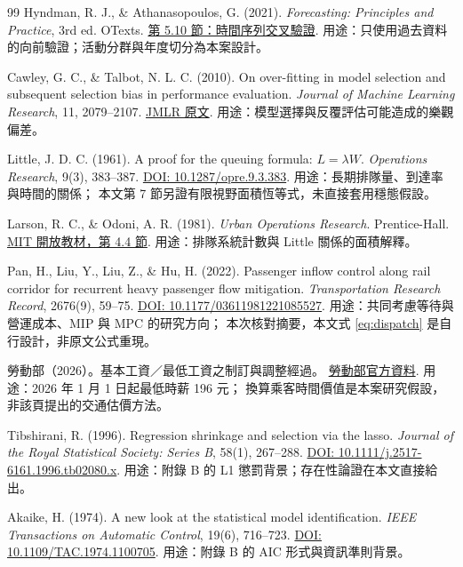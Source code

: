 \begin{thebibliography}{99}
Hyndman, R. J., \& Athanasopoulos, G. (2021).
\emph{Forecasting: Principles and Practice}, 3rd ed. OTexts.
\href{https://otexts.com/fpp3/tscv.html}{第 5.10 節：時間序列交叉驗證}.
用途：只使用過去資料的向前驗證；活動分群與年度切分為本案設計。

Cawley, G. C., \& Talbot, N. L. C. (2010).
On over-fitting in model selection and subsequent selection bias in performance evaluation.
\emph{Journal of Machine Learning Research}, 11, 2079--2107.
\href{https://www.jmlr.org/papers/v11/cawley10a.html}{JMLR 原文}.
用途：模型選擇與反覆評估可能造成的樂觀偏差。

Little, J. D. C. (1961).
A proof for the queuing formula: $L=\lambda W$.
\emph{Operations Research}, 9(3), 383--387.
\href{https://doi.org/10.1287/opre.9.3.383}{DOI: 10.1287/opre.9.3.383}.
用途：長期排隊量、到達率與時間的關係；
本文第 7 節另證有限視野面積恆等式，未直接套用穩態假設。

Larson, R. C., \& Odoni, A. R. (1981).
\emph{Urban Operations Research}. Prentice-Hall.
\href{https://web.mit.edu/urban_or_book/www/book/chapter4/4.4.html}{MIT 開放教材，第 4.4 節}.
用途：排隊系統計數與 Little 關係的面積解釋。

Pan, H., Liu, Y., Liu, Z., \& Hu, H. (2022).
Passenger inflow control along rail corridor for recurrent heavy passenger flow mitigation.
\emph{Transportation Research Record}, 2676(9), 59--75.
\href{https://doi.org/10.1177/03611981221085527}{DOI: 10.1177/03611981221085527}.
用途：共同考慮等待與營運成本、MIP 與 MPC 的研究方向；
本次核對摘要，本文式 \eqref{eq:dispatch} 是自行設計，非原文公式重現。

勞動部（2026）。基本工資／最低工資之制訂與調整經過。
\href{https://www.mol.gov.tw/1607/28690/2282/2284/2290/7121/}{勞動部官方資料}.
用途：2026 年 1 月 1 日起最低時薪 196 元；
換算乘客時間價值是本案研究假設，非該頁提出的交通估價方法。

Tibshirani, R. (1996).
Regression shrinkage and selection via the lasso.
\emph{Journal of the Royal Statistical Society: Series B}, 58(1), 267--288.
\href{https://doi.org/10.1111/j.2517-6161.1996.tb02080.x}{DOI: 10.1111/j.2517-6161.1996.tb02080.x}.
用途：附錄 B 的 L1 懲罰背景；存在性論證在本文直接給出。

Akaike, H. (1974).
A new look at the statistical model identification.
\emph{IEEE Transactions on Automatic Control}, 19(6), 716--723.
\href{https://doi.org/10.1109/TAC.1974.1100705}{DOI: 10.1109/TAC.1974.1100705}.
用途：附錄 B 的 AIC 形式與資訊準則背景。
\end{thebibliography}
